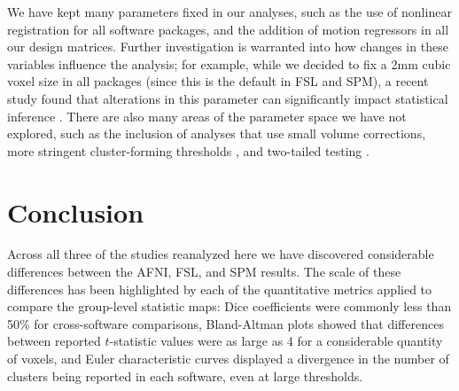 We have kept many parameters fixed in our analyses, such as the use of nonlinear registration for all software packages, and the addition of motion regressors in all our design matrices. Further investigation is warranted into how changes in these variables influence the analysis; for example, while we decided to fix a 2mm cubic voxel size in all packages (since this is the default in FSL and SPM), a recent study found that alterations in this parameter can significantly impact statistical inference \citep{Mueller2017-pn}. There are also many areas of the parameter space we have not explored, such as the inclusion of analyses that use small volume corrections, more stringent cluster-forming thresholds \citep{Eklund2016-ak, Woo2014-ji}, and two-tailed testing \citep{Chen2018-am}. 

\section{Conclusion}

Across all three of the studies reanalyzed here we have discovered considerable differences between the AFNI, FSL, and SPM results. The scale of these differences has been highlighted by each of the quantitative metrics applied to compare the group-level statistic maps: Dice coefficients were commonly less than 50\% for cross-software comparisons, Bland-Altman plots showed that differences between reported $t$-statistic values were as large as 4 for a considerable quantity of voxels, and Euler characteristic curves displayed a divergence in the number of clusters being reported in each software, even at large thresholds. 


